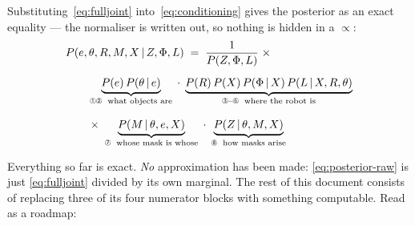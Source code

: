 \documentclass[11pt,a4paper]{report}
\newcommand{\given}{\,|\,}
\theoremstyle{definition}   %
\begin{document}
Substituting~\eqref{eq:fulljoint} into~\eqref{eq:conditioning} gives the posterior as an exact
equality --- the normaliser is written out, so nothing is hidden in a $\propto$:
\begin{align}
&P\!\left(e,\theta,R,M,X\given Z,\Phi,L\right)\;=\;\frac{1}{P(Z,\Phi,L)}\;\times
\nonumber\\[5pt]
&\qquad
\underbrace{P(e)\,P(\theta\given e)}_{\text{\ding{192}\ding{193}\; what objects are}}
\;\cdot\;
\underbrace{P(R)\,P(X)\,P(\Phi\given X)\,P(L\given X,R,\theta)}_{\text{\ding{194}--\ding{197}\; where the robot is}}
\nonumber\\[7pt]
&\qquad\times\;
\underbrace{P(M\given\theta,e,X)}_{\text{\ding{198}\; whose mask is whose}}
\;\cdot\;
\underbrace{P(Z\given\theta,M,X)}_{\text{\ding{199}\; how masks arise}}
\label{eq:posterior-raw}
\end{align}

\noindent
Everything so far is exact. \emph{No} approximation has been made: \eqref{eq:posterior-raw} is
just \eqref{eq:fulljoint} divided by its own marginal. The rest of this document consists of
replacing three of its four numerator blocks with something computable. Read as a roadmap:
\end{document}
